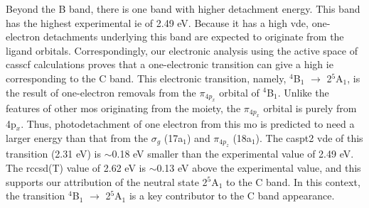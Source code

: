 \begin{refsection}
Beyond the B band, there is one band with higher detachment energy. This band has the highest experimental \acrshort{ie} of 2.49 eV. Because it has a high \acrshort{vde}, one-electron detachments underlying this band are expected to originate from the ligand orbitals. Correspondingly, our electronic analysis using the active space of \acrshort{casscf} calculations proves that a one-electronic transition can give a high \acrshort{ie} corresponding to the C band. This electronic transition, namely, $^4$B$_1$ $\longrightarrow$ 2$^5$A$_1$, is the result of one-electron removals from the $\pi_{4p_x}$ orbital of $^4$B$_1$. Unlike the features of other \acrshort{mo}s originating from the  moiety, the $\pi_{4p_x}$ orbital is purely from 4p$_x$. Thus, photodetachment of one electron from this \acrshort{mo} is predicted to need a larger energy than that from the $\sigma_g$ (17a$_1$) and $\pi_{4p_z}$ (18a$_1$). The \acrshort{caspt2} \acrshort{vde} of this transition (2.31 eV) is $\sim$0.18 eV smaller than the experimental value of 2.49 eV. The \acrshort{rccsd}(T) value of 2.62 eV is $\sim$0.13 eV above the experimental value, and this supports our attribution of the neutral state 2$^5$A$_1$ to the C band. In this context, the transition $^4$B$_1$ $\longrightarrow$ 2$^5$A$_1$ is a key contributor to the C band appearance.







\end{refsection}
